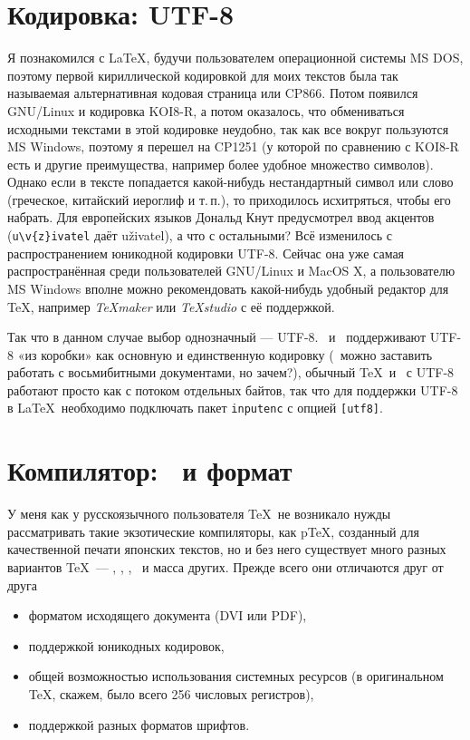 \documentclass[a4paper,12pt,hyphens]{article}
\newcommand\softname[1]{\textit{#1}}
\newcommand\package[1]{\texttt{#1}}
\begin{document}
\section{Кодировка: UTF-8}
Я познакомился с \LaTeX, будучи пользователем операционной системы MS DOS,
поэтому первой кириллической кодировкой для моих текстов была так называемая
альтернативная кодовая страница или CP866. Потом появился GNU/Linux и кодировка
KOI8-R, а потом оказалось, что обмениваться исходными текстами в этой кодировке
неудобно, так как все вокруг пользуются MS Windows, поэтому я перешел на
CP1251 (у которой по сравнению с KOI8-R есть и другие преимущества, например
более удобное множество символов). Однако если в тексте попадается какой-нибудь
нестандартный символ или слово (греческое, китайский иероглиф и т.\,п.), то
приходилось исхитряться, чтобы его набрать. Для европейских языков Дональд Кнут
предусмотрел ввод акцентов (\verb|u\v{z}ivatel| даёт u\v{z}ivatel), а что с
остальными? Всё изменилось с распространением юникодной кодировки UTF-8. Сейчас
она уже самая распространённая среди пользователей GNU/Linux и MacOS X,
а пользователю MS Windows вполне можно рекомендовать какой-нибудь удобный
редактор для \TeX, например \softname{TeXmaker} \parencite{site-texmaker}
или \softname{TeXstudio} \parencite{site-texstudio} с её поддержкой.

Так что в данном случае выбор однозначный --- UTF-8. \LuaTeX\ и \XeTeX\ поддерживают
UTF-8 «из коробки» как основную и единственную кодировку (\LuaLaTeX\ можно
заставить работать с восьмибитными документами, но зачем?), обычный \TeX\
и \pdfTeX\ с UTF-8 работают просто как с потоком отдельных байтов, так что
для поддержки UTF-8 в \LaTeX\ необходимо подключать пакет \package{inputenc}
с опцией \verb|[utf8]|.

\section{Компилятор: \LuaTeX\ и формат \LuaLaTeX}
У меня как у русскоязычного пользователя \TeX\ не возникало нужды рассматривать
такие экзотические компиляторы, как p\TeX, созданный для качественной печати японских
текстов, но и без него существует много разных вариантов \TeX\ --- \eTeX, \pdfTeX,
\XeTeX, \LuaTeX\ и масса других. Прежде всего они отличаются
друг от друга
\begin{itemize}
\item форматом исходящего документа (DVI или PDF),
\item поддержкой юникодных кодировок,
\item общей возможностью использования системных ресурсов (в оригинальном \TeX,
скажем, было всего 256 числовых регистров),
\item поддержкой разных форматов шрифтов.
\end{itemize}
\end{document}

